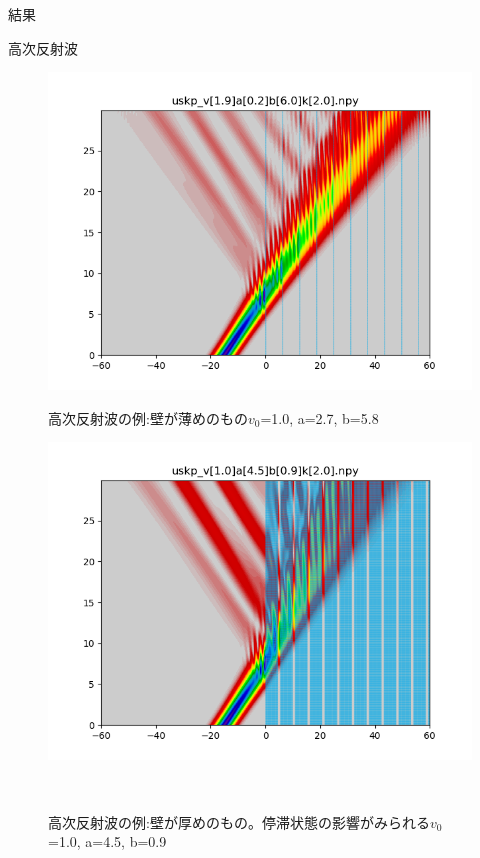 \documentclass[a4paper, lualatex]{bxjsarticle}
\begin{document}
\begin{section}{結果}
\newpage
    \begin{subsection}{高次反射波}
     \begin{figure}[h]
        \begin{minipage}{0.5\hsize}
            \centering
            \includegraphics[width=0.9\hsize]{tajuhan1.png}
            \caption{高次反射波の例:壁が薄めのもの$v_0$=1.0, a=2.7, b=5.8}
            \label{thin}
        \end{minipage}
        \begin{minipage}{0.5\hsize}
            \centering
            \includegraphics[width=0.9\hsize]{tajuhan2.png}
            \caption{高次反射波の例:壁が厚めのもの。停滞状態の影響がみられる$v_0$=1.0, a=4.5, b=0.9}
            \label{thick}
        \end{minipage}\\
        \begin{minipage}{0.5\hsize}

\end{minipage}
\end{figure}
\end{subsection}
\end{section}
\end{document}
